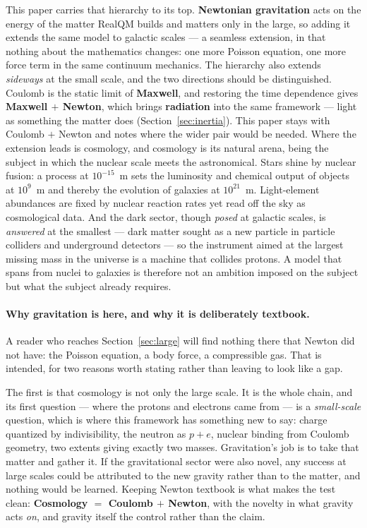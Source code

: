 \documentclass[11pt]{article}
\begin{document}
This paper carries that hierarchy to its top. \textbf{Newtonian gravitation} acts on the energy of the matter
RealQM builds and matters only in the large, so adding it extends the same model to galactic scales --- a seamless
extension, in that nothing about the mathematics changes: one more Poisson equation, one more force term in the
same continuum mechanics. The hierarchy also extends \emph{sideways} at the small scale, and the two directions
should be distinguished. Coulomb is the static limit of \textbf{Maxwell}, and restoring the time dependence gives
\textbf{Maxwell $+$ Newton}, which brings \textbf{radiation} into the same framework --- light as something the
matter does (Section~\ref{sec:inertia}). This paper stays with Coulomb $+$ Newton and notes where the wider pair
would be needed. Where the extension leads is cosmology, and cosmology is its natural arena, being the
subject in which the nuclear scale meets the astronomical. Stars shine by nuclear fusion: a process at
$10^{-15}$~m sets the luminosity and chemical output of objects at $10^{9}$~m and thereby the evolution of galaxies
at $10^{21}$~m. Light-element abundances are fixed by nuclear reaction rates yet read off the sky as cosmological
data. And the dark sector, though \emph{posed} at galactic scales, is \emph{answered} at the smallest --- dark
matter sought as a new particle in particle colliders and underground detectors --- so the instrument aimed at the
largest missing mass in the universe is a machine that collides protons. A model that spans from nuclei to galaxies
is therefore not an ambition imposed on the subject but what the subject already requires.

\paragraph{Why gravitation is here, and why it is deliberately textbook.} A reader who reaches
Section~\ref{sec:large} will find nothing there that Newton did not have: the Poisson equation, a body force, a
compressible gas. That is intended, for two reasons worth stating rather than leaving to look like a gap.

The first is that cosmology is not only the large scale. It is the whole chain, and its first question --- where
the protons and electrons came from --- is a \emph{small-scale} question, which is where this framework has
something new to say: charge quantized by indivisibility, the neutron as $p+e$, nuclear binding from Coulomb
geometry, two extents giving exactly two masses. Gravitation's job is to take that matter and gather it. If the
gravitational sector were also novel, any success at large scales could be attributed to the new gravity rather
than to the matter, and nothing would be learned. Keeping Newton textbook is what makes the test clean:
\textbf{Cosmology $=$ Coulomb $+$ Newton}, with the novelty in what gravity acts \emph{on}, and gravity itself
the control rather than the claim.
\end{document}
